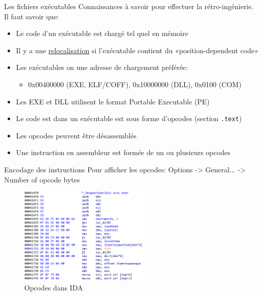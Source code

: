 \documentclass[10pt,xcolor={table,dvipsnames},t]{beamer}
\begin{document}
\begin{frame}{Les fichiers exécutables}
    Connaissances à savoir pour effectuer la rétro-ingénierie. Il faut savoir que:
    \begin{itemize}
        \item Le code d'un exécutable est chargé tel quel en mémoire
        \item Il y a une \href{https://en.wikipedia.org/wiki/Relocation_(computing)}{relocalisation} si l'exécutable contient du «position-dependent code»
        \item Les exécutables on une adresse de chargement préférée: 
        \begin{itemize}
            \item 0x00400000 (EXE, ELF/COFF), 0x10000000 (DLL), 0x0100 (COM)
        \end{itemize}
        \item Les EXE et DLL utilisent le format Portable Executable (PE) %
        \item Le code est dans un exécutable est sous forme d'opcodes (section \texttt{.text})
        \item Les opcodes peuvent être désassemblés
        \item Une instruction en assembleur est formée de un ou plusieurs opcodes
    \end{itemize}
\end{frame}

\begin{frame}{Encodage des instructions}
    Pour afficher les opcodes: Options -> General... -> Number of opcode bytes
    \begin{figure}
        \includegraphics[width=0.55\textwidth]{Opcodes}
        \caption{\label{fig:opcodes}Opcodes dans IDA}
    \end{figure}

\end{frame}
\end{document}
